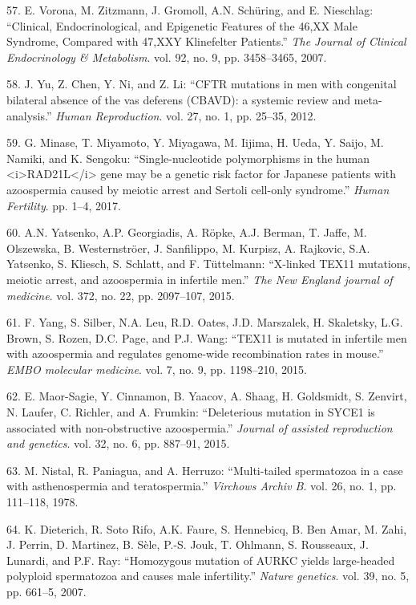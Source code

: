 \documentclass[12pt,twoside]{ugathesis}
\theoremstyle{definition}
\theoremstyle{definition}
\theoremstyle{remark}
\begin{document}
\hypertarget{ref-Vorona2007}{}
57. E. Vorona, M. Zitzmann, J. Gromoll, A.N. Schüring, and E. Nieschlag:
``Clinical, Endocrinological, and Epigenetic Features of the 46,XX Male
Syndrome, Compared with 47,XXY Klinefelter Patients.'' \emph{The Journal
of Clinical Endocrinology \& Metabolism}. vol. 92, no. 9, pp.
3458--3465, 2007.

\hypertarget{ref-Yu2012}{}
58. J. Yu, Z. Chen, Y. Ni, and Z. Li: ``CFTR mutations in men with
congenital bilateral absence of the vas deferens (CBAVD): a systemic
review and meta-analysis.'' \emph{Human Reproduction}. vol. 27, no. 1,
pp. 25--35, 2012.

\hypertarget{ref-Minase2017}{}
59. G. Minase, T. Miyamoto, Y. Miyagawa, M. Iijima, H. Ueda, Y. Saijo,
M. Namiki, and K. Sengoku: ``Single-nucleotide polymorphisms in the
human \textless{}i\textgreater{}RAD21L\textless{}/i\textgreater{} gene
may be a genetic risk factor for Japanese patients with azoospermia
caused by meiotic arrest and Sertoli cell-only syndrome.'' \emph{Human
Fertility}. pp. 1--4, 2017.

\hypertarget{ref-Yatsenko2015}{}
60. A.N. Yatsenko, A.P. Georgiadis, A. Röpke, A.J. Berman, T. Jaffe, M.
Olszewska, B. Westernströer, J. Sanfilippo, M. Kurpisz, A. Rajkovic,
S.A. Yatsenko, S. Kliesch, S. Schlatt, and F. Tüttelmann: ``X-linked
TEX11 mutations, meiotic arrest, and azoospermia in infertile men.''
\emph{The New England journal of medicine}. vol. 372, no. 22, pp.
2097--107, 2015.

\hypertarget{ref-Yang2015}{}
61. F. Yang, S. Silber, N.A. Leu, R.D. Oates, J.D. Marszalek, H.
Skaletsky, L.G. Brown, S. Rozen, D.C. Page, and P.J. Wang: ``TEX11 is
mutated in infertile men with azoospermia and regulates genome-wide
recombination rates in mouse.'' \emph{EMBO molecular medicine}. vol. 7,
no. 9, pp. 1198--210, 2015.

\hypertarget{ref-Maor-Sagie2015}{}
62. E. Maor-Sagie, Y. Cinnamon, B. Yaacov, A. Shaag, H. Goldsmidt, S.
Zenvirt, N. Laufer, C. Richler, and A. Frumkin: ``Deleterious mutation
in SYCE1 is associated with non-obstructive azoospermia.'' \emph{Journal
of assisted reproduction and genetics}. vol. 32, no. 6, pp. 887--91,
2015.

\hypertarget{ref-Nistal}{}
63. M. Nistal, R. Paniagua, and A. Herruzo: ``Multi-tailed spermatozoa
in a case with asthenospermia and teratospermia.'' \emph{Virchows Archiv
B}. vol. 26, no. 1, pp. 111--118, 1978.

\hypertarget{ref-Dieterich2007}{}
64. K. Dieterich, R. Soto Rifo, A.K. Faure, S. Hennebicq, B. Ben Amar,
M. Zahi, J. Perrin, D. Martinez, B. Sèle, P.-S. Jouk, T. Ohlmann, S.
Rousseaux, J. Lunardi, and P.F. Ray: ``Homozygous mutation of AURKC
yields large-headed polyploid spermatozoa and causes male infertility.''
\emph{Nature genetics}. vol. 39, no. 5, pp. 661--5, 2007.
\end{document}
